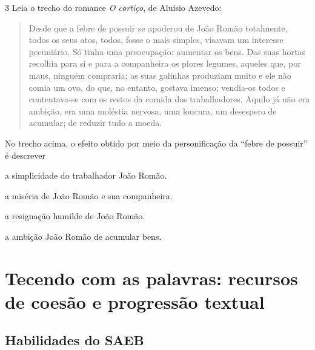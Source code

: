 \num{3} Leia o trecho do romance \textit{O cortiço}, de Aluísio Azevedo:



\begin{quote}

Desde que a febre de possuir se apoderou de João Romão totalmente, todos os seus atos, todos, 
fosse o mais simples, visavam um interesse pecuniário. Só tinha uma preocupação: aumentar 
os bens. Das suas hortas recolhia para si e para a companheira os piores legumes, aqueles que,
por maus, ninguém compraria; as suas galinhas produziam muito e ele não comia um ovo, do que, 
no entanto, gostava imenso; vendia-os todos e contentava-se com os restos da comida dos 
trabalhadores. Aquilo já não era ambição, era uma moléstia nervosa, uma loucura, um desespero
de acumular; de reduzir tudo a moeda.

\end{quote}


No trecho acima, o efeito obtido por meio da personificação da ``febre de possuir'' é descrever

\begin{escolha}
  
  \item a simplicidade do trabalhador João Romão. 
  
  \item a miséria de João Romão e sua companheira.
  
  \item a resignação humilde de João Romão. 
  
  \item a ambição João Romão de acumular bens. 

\end{escolha}


\chapter{Tecendo com as palavras: recursos de coesão e progressão textual}

\section{Habilidades do SAEB}

